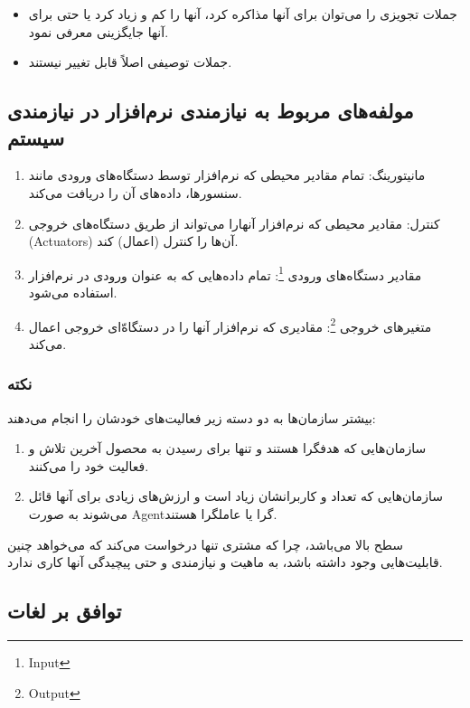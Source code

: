\begin{itemize}
    \item جملات تجویزی را می‌توان برای آنها مذاکره کرد، آنها را کم و زیاد کرد یا
    حتی برای آنها جایگزینی معرفی نمود.
    \item جملات توصیفی اصلاً قابل تغییر نیستند.
\end{itemize}

\subsection{مولفه‌های مربوط به نیازمندی نرم‌افزار در نیازمندی سیستم}

\begin{enumerate}
    \item مانیتورینگ: تمام مقادیر محیطی که نرم‌افزار توسط دستگاه‌های ورودی مانند
    سنسور‌ها، داده‌های آن را دریافت می‌کند.
    \item کنترل: مقادیر محیطی که نرم‌افزار آنهارا می‌تواند از طریق دستگاه‌های
    خروجی (Actuators) آن‌ها را کنترل (اعمال) کند.
    \item مقادیر دستگاه‌های ورودی \footnote{Input}: تمام داده‌هایی که به عنوان
    ورودی در نرم‌افزار استفاده می‌شود.
    \item متغیر‌های خروجی \footnote{Output}: مقادیری که نرم‌افزار آنها را در
    دستگاه‌ّای خروجی اعمال می‌کند.
\end{enumerate}

\subsubsection*{نکته}

بیشتر سازمان‌ها به دو دسته زیر فعالیت‌های خودشان را انجام می‌دهند:

\begin{enumerate}
    \item سازمان‌هایی که هدفگرا هستند و تنها برای رسیدن به محصول آخرین تلاش و
    فعالیت خود را می‌کنند.
    \item سازمان‌هایی که تعداد  و کاربرانشان زیاد است و ارزش‌های زیادی
    برای آنها قائل می‌شوند به صورت Agentگرا یا عاملگرا هستند.
\end{enumerate}

سطح  بالا می‌باشد، چرا که مشتری تنها درخواست می‌کند که
می‌خواهد چنین قابلیت‌هایی وجود داشته باشد، به ماهیت و نیازمندی و حتی پیچیدگی
آنها کاری ندارد.

\subsection{توافق بر لغات}

